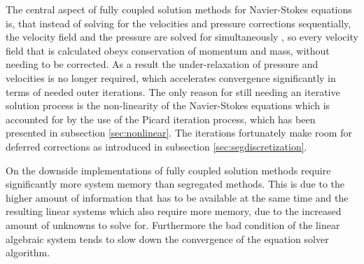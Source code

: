 The central aspect of fully coupled solution methods for Navier-Stokes equations is, that instead of solving for the velocities and pressure corrections sequentially, the velocity field and the pressure are solved for simultaneously \cite{schaefer99}, so every velocity field that is calculated obeys conservation of momentum and mass, without needing to be corrected. As a result the under-relaxation of pressure and velocities is no longer required, which accelerates convergence significantly in terms of needed outer iterations. The only reason for still needing an iterative solution process is the non-linearity of the Navier-Stokes equations which is accounted for by the use of the Picard iteration process, which has been presented in subsection \ref{sec:nonlinear}. The iterations fortunately make room for deferred corrections as introduced in subsection \ref{sec:segdiscretization}.

On the downside implementations of fully coupled solution methods require significantly more system memory than segregated methods. This is due to the higher amount of information that has to be available at the same time and the resulting linear systems which also require more memory, due to the increased amount of unknowns to solve for. Furthermore the bad condition of the linear algebraic system \cite{schaefer99} tends to slow down the convergence of the equation solver algorithm.

